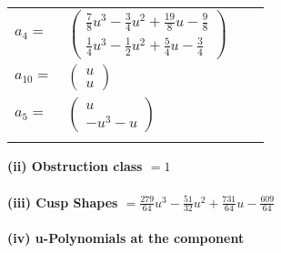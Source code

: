 \documentclass[1p]{elsarticle_modified}
\theoremstyle{definition}
\begin{document}
\begin{tabular}{m{7pt} m{180pt} m{7pt} m{180pt} }
\flushright $a_{4}=$&$\begin{pmatrix}\frac{7}{8} u^3-\frac{3}{4} u^2+\frac{19}{8} u-\frac{9}{8}\\\frac{1}{4} u^3-\frac{1}{2} u^2+\frac{5}{4} u-\frac{3}{4}\end{pmatrix}$ \\
\flushright $a_{10}=$&$\begin{pmatrix}u\\u\end{pmatrix}$ \\
\flushright $a_{5}=$&$\begin{pmatrix}u\\- u^3- u\end{pmatrix}$\\&\end{tabular}
\flushleft \textbf{(ii) Obstruction class $= 1$}\\~\\
\flushleft \textbf{(iii) Cusp Shapes $= \frac{279}{64} u^3-\frac{51}{32} u^2+\frac{731}{64} u-\frac{609}{64}$}\\~\\
\newpage\renewcommand{\arraystretch}{1}
\flushleft \textbf{(iv) u-Polynomials at the component}\newline \\
\end{document}
